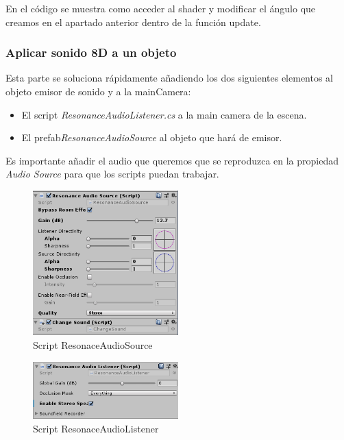 \quad En el código se muestra como acceder al shader y modificar el ángulo que creamos en el apartado anterior dentro de la función update.\\

\subsubsection{Aplicar sonido 8D a un objeto}

\quad Esta parte se soluciona rápidamente añadiendo los dos siguientes elementos al objeto emisor de sonido y a la mainCamera:\\

\begin{itemize}
	\item El script \textit{ResonanceAudioListener.cs} a la main camera de la escena.
	\item El prefab\textit{ResonanceAudioSource} al objeto que hará de emisor.
\end{itemize}

\quad Es importante añadir el audio que queremos que se reproduzca en la propiedad \textit{Audio Source} para que los scripts puedan trabajar.\\

\begin{figure}[htb]
	\centering
	\includegraphics[width=0.5\textwidth]{./imagenes/audiosource}
	\caption{Script ResonaceAudioSource}
\end{figure} 

\begin{figure}[htb]
	\centering
	\includegraphics[width=0.5\textwidth]{./imagenes/audiolistener}
	\caption{Script ResonaceAudioListener}
\end{figure} 

